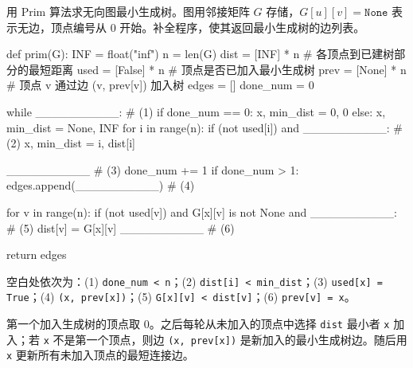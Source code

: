 \begin{question}[Prim 算法]
用 Prim 算法求无向图最小生成树。图用邻接矩阵 $G$ 存储，$G[u][v]=\texttt{None}$ 表示无边，顶点编号从 $0$ 开始。补全程序，使其返回最小生成树的边列表。

\begin{pycode}
def prim(G):
    INF = float("inf")
    n = len(G)
    dist = [INF] * n       # 各顶点到已建树部分的最短距离
    used = [False] * n     # 顶点是否已加入最小生成树
    prev = [None] * n      # 顶点 v 通过边 (v, prev[v]) 加入树
    edges = []
    done_num = 0

    while __________:                            # (1)
        if done_num == 0:
            x, min_dist = 0, 0
        else:
            x, min_dist = None, INF
            for i in range(n):
                if (not used[i]) and __________: # (2)
                    x, min_dist = i, dist[i]

        __________                                # (3)
        done_num += 1
        if done_num > 1:
            edges.append(__________)             # (4)

        for v in range(n):
            if (not used[v]) and G[x][v] is not None and __________: # (5)
                dist[v] = G[x][v]
                __________                        # (6)

    return edges
\end{pycode}
\begin{solution}
空白处依次为：(1) \texttt{done\_num < n}；(2) \texttt{dist[i] < min\_dist}；(3) \texttt{used[x] = True}；(4) \texttt{(x, prev[x])}；(5) \texttt{G[x][v] < dist[v]}；(6) \texttt{prev[v] = x}。

第一个加入生成树的顶点取 $0$。之后每轮从未加入的顶点中选择 \texttt{dist} 最小者 \texttt{x} 加入；若 \texttt{x} 不是第一个顶点，则边 \texttt{(x, prev[x])} 是新加入的最小生成树边。随后用 \texttt{x} 更新所有未加入顶点的最短连接边。
\end{solution}
\end{question}


